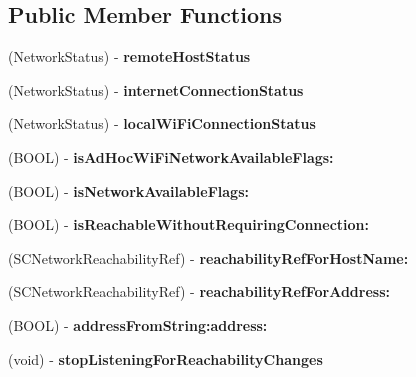 \subsection*{Public Member Functions}
\begin{DoxyCompactItemize}
\item 
\hypertarget{interface_reachability_a6ecc8d99fb8ac6789ea6d16142b74dc2}{
(NetworkStatus) -\/ {\bfseries remoteHostStatus}}
\label{interface_reachability_a6ecc8d99fb8ac6789ea6d16142b74dc2}

\item 
\hypertarget{interface_reachability_ad4d2d27655546f497674c0482fcdf2a2}{
(NetworkStatus) -\/ {\bfseries internetConnectionStatus}}
\label{interface_reachability_ad4d2d27655546f497674c0482fcdf2a2}

\item 
\hypertarget{interface_reachability_aac00857972589ed142e782f18b6cc676}{
(NetworkStatus) -\/ {\bfseries localWiFiConnectionStatus}}
\label{interface_reachability_aac00857972589ed142e782f18b6cc676}

\item 
\hypertarget{interface_reachability_a4feb6e656192790a0d940cf77f72033e}{
(BOOL) -\/ {\bfseries isAdHocWiFiNetworkAvailableFlags:}}
\label{interface_reachability_a4feb6e656192790a0d940cf77f72033e}

\item 
\hypertarget{interface_reachability_ac9193b581d1ce2ddbbf963128801c62f}{
(BOOL) -\/ {\bfseries isNetworkAvailableFlags:}}
\label{interface_reachability_ac9193b581d1ce2ddbbf963128801c62f}

\item 
\hypertarget{interface_reachability_a4e1737634c04c4e68c8b47d779a51be8}{
(BOOL) -\/ {\bfseries isReachableWithoutRequiringConnection:}}
\label{interface_reachability_a4e1737634c04c4e68c8b47d779a51be8}

\item 
\hypertarget{interface_reachability_ada171d5d04316dc8dab6ad0eb98f0406}{
(SCNetworkReachabilityRef) -\/ {\bfseries reachabilityRefForHostName:}}
\label{interface_reachability_ada171d5d04316dc8dab6ad0eb98f0406}

\item 
\hypertarget{interface_reachability_a549133dd525c737cceceedc5048a4325}{
(SCNetworkReachabilityRef) -\/ {\bfseries reachabilityRefForAddress:}}
\label{interface_reachability_a549133dd525c737cceceedc5048a4325}

\item 
\hypertarget{interface_reachability_aa12f7129934d05939b8cf3d21588c1d3}{
(BOOL) -\/ {\bfseries addressFromString:address:}}
\label{interface_reachability_aa12f7129934d05939b8cf3d21588c1d3}

\item 
\hypertarget{interface_reachability_a7b0aad2473839d800fcd0bb9699c6b04}{
(void) -\/ {\bfseries stopListeningForReachabilityChanges}}
\label{interface_reachability_a7b0aad2473839d800fcd0bb9699c6b04}

\end{DoxyCompactItemize}
